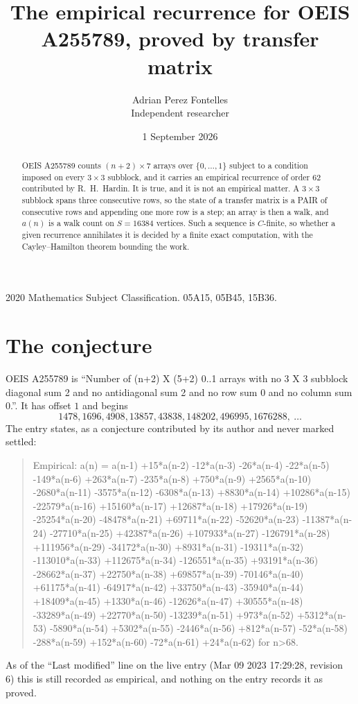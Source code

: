 \documentclass[11pt,a4paper]{article}
\title{The empirical recurrence for OEIS A255789, proved by transfer matrix}
\author{Adrian Perez Fontelles\\ \small Independent researcher}
\date{1 September 2026}
\theoremstyle{plain}
\theoremstyle{definition}
\begin{document}
\maketitle

\begin{abstract}
OEIS A255789 counts $(n+2)\times7$ arrays over $\{0,\dots,1\}$ subject to a condition imposed on
every $3\times3$ subblock, and it carries an empirical recurrence of order $62$
contributed by R.~H.~Hardin. It is true, and it is not an empirical matter. A $3\times3$
subblock spans three consecutive rows, so the state of a transfer matrix is a PAIR of
consecutive rows and appending one more row is a step; an array is then a walk, and
$a(n)$ is a walk count on $S=16384$ vertices. Such a sequence is $C$-finite, so whether a given
recurrence annihilates it is decided by a finite exact computation, with the Cayley--Hamilton
theorem bounding the work.
\end{abstract}

\noindent\small 2020 Mathematics Subject Classification. 05A15, 05B45, 15B36.\normalsize

\section{The conjecture}

OEIS A255789 is ``Number of (n+2) X (5+2) 0..1 arrays with no 3 X 3 subblock diagonal sum 2 and no antidiagonal sum 2 and no row sum 0 and no column sum 0.''. It has offset $1$ and begins
\[
1478, 1696, 4908, 13857, 43838, 148202, 496995, 1676288,\ \dots
\]
The entry states, as a conjecture contributed by its author and never marked settled:
\begin{quote}
Empirical: a(n) = a(n-1) +15*a(n-2) -12*a(n-3) -26*a(n-4) -22*a(n-5) -149*a(n-6) +263*a(n-7) -235*a(n-8) +750*a(n-9) +2565*a(n-10) -2680*a(n-11) -3575*a(n-12) -6308*a(n-13) +8830*a(n-14) +10286*a(n-15) -22579*a(n-16) +15160*a(n-17) +12687*a(n-18) +17926*a(n-19) -25254*a(n-20) -48478*a(n-21) +69711*a(n-22) -52620*a(n-23) -11387*a(n-24) -27710*a(n-25) +42387*a(n-26) +107933*a(n-27) -126791*a(n-28) +111956*a(n-29) -34172*a(n-30) +8931*a(n-31) -19311*a(n-32) -113010*a(n-33) +112675*a(n-34) -126551*a(n-35) +93191*a(n-36) -28662*a(n-37) +22750*a(n-38) +69857*a(n-39) -70146*a(n-40) +61175*a(n-41) -64917*a(n-42) +33750*a(n-43) -35940*a(n-44) +18409*a(n-45) +1330*a(n-46) -12626*a(n-47) +30555*a(n-48) -33289*a(n-49) +22770*a(n-50) -13239*a(n-51) +973*a(n-52) +5312*a(n-53) -5890*a(n-54) +5302*a(n-55) -2446*a(n-56) +812*a(n-57) -52*a(n-58) -288*a(n-59) +152*a(n-60) -72*a(n-61) +24*a(n-62) for n>68.
\end{quote}
As of the ``Last modified'' line on the live entry (Mar 09 2023 17:29:28, revision 6) this is still
recorded as empirical, and nothing on the entry records it as proved.
\end{document}
